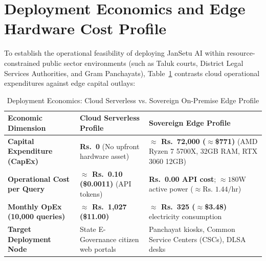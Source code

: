 \documentclass[12pt,a4paper,oneside]{report}
\begin{document}
\section{Deployment Economics and Edge Hardware Cost Profile}
To establish the operational feasibility of deploying JanSetu AI within resource-constrained public sector environments (such as Taluk courts, District Legal Services Authorities, and Gram Panchayats), Table~\ref{tab:deployment_economics} contrasts cloud operational expenditures against edge capital outlays:

\begin{table}[H]
\centering
\small
\caption{Deployment Economics: Cloud Serverless vs. Sovereign On-Premise Edge Profile}
\label{tab:deployment_economics}
\begin{tabularx}{\textwidth}{lXX}
\toprule
\textbf{Economic Dimension} & \textbf{Cloud Serverless Profile} & \textbf{Sovereign Edge Profile} \\
\midrule
\textbf{Capital Expenditure (CapEx)} & \textbf{Rs.~0} (No upfront hardware asset) & \textbf{$\approx$ Rs.~72,000 ($\approx$\$771)} (AMD Ryzen 7 5700X, 32GB RAM, RTX 3060 12GB) \\
\addlinespace
\textbf{Operational Cost per Query} & \textbf{$\approx$ Rs.~0.10 (\$0.0011)} (API tokens) & \textbf{Rs.~0.00 API cost}; $\approx 180\text{W}$ active power ($\approx \text{Rs.~}1.44\text{/hr}$) \\
\addlinespace
\textbf{Monthly OpEx (10,000 queries)} & \textbf{$\approx$ Rs.~1,027 (\$11.00)} & \textbf{$\approx$ Rs.~325 ($\approx$\$3.48)} electricity consumption \\
\addlinespace
\textbf{Target Deployment Node} & State E-Governance citizen web portals & Panchayat kiosks, Common Service Centers (CSCs), DLSA desks \\
\bottomrule
\end{tabularx}
\end{table}
\end{document}

